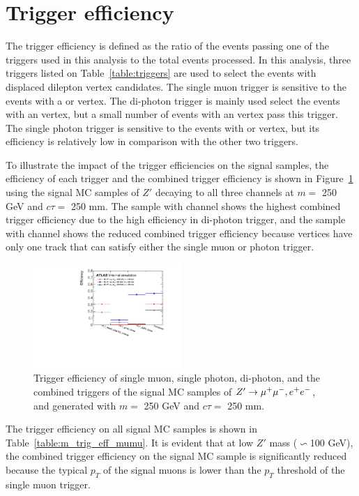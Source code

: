\section{Trigger efficiency}
\label{sec:trigger_efficiency}
The trigger efficiency is defined as the ratio of the events passing one of the triggers used in this analysis to the total events processed. In this analysis, three triggers listed on Table~\ref{table:triggers} are used to select the events with displaced dilepton vertex candidates. The single muon trigger is sensitive to the events with a \mumu or \emu vertex. The di-photon trigger is mainly used select the events with an \ee vertex, but a small number of events with an \emu vertex pass this trigger. The single photon trigger is sensitive to the events with \ee or \emu vertex, but its efficiency is relatively low in comparison with the other two triggers.

To illustrate the impact of the trigger efficiencies on the signal samples, the efficiency of each trigger and the combined trigger efficiency is shown in Figure~\ref{fig:m_trig_eff_allchannel} using the signal MC samples of $Z'$ decaying to all three channels at $m = $ 250 GeV and $c\tau=$ 250 mm. The sample with \ee channel shows the highest combined trigger efficiency due to the high efficiency in di-photon trigger, and the sample with \emu channel shows the reduced combined trigger efficiency because \emu vertices have only one track that can satisfy either the single muon or photon trigger.

\begin{figure}[!htb]
	\includegraphics[width=0.50\textwidth]{figures/m_dv_eff_trig_allchannel.pdf}
	\centering
	\caption{Trigger efficiency of single muon, single photon, di-photon, and the combined triggers of the signal MC samples of $Z'\rightarrow\mu^{+}\mu^{-}, e^{+}e^{-}$, and \emu generated with $m=$ 250 GeV and $c\tau=$ 250 mm.}
	\label{fig:m_trig_eff_allchannel}
\end{figure}

The trigger efficiency on all \mumu signal MC samples is shown in Table~\ref{table:m_trig_eff_mumu}. It is evident that at low $Z'$ mass ($\backsim$100 GeV), the combined trigger efficiency on the signal MC sample is significantly reduced because the typical $p_{T}$ of the signal muons is lower than the $p_{T}$ threshold of the single muon trigger.

